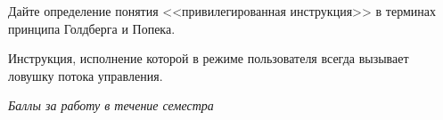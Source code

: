 \documentclass[a4paper, addpoints]{exam}
\begin{document}
\begin{questions}
\question[2] Дайте определение понятия <<привилегированная инструкция>> в терминах принципа Голдберга и Попека.
\begin{solution}[2cm]
Инструкция, исполнение которой в режиме пользователя всегда вызывает ловушку потока управления.
\end{solution}

\bonusquestion \textit{Баллы за работу в течение семестра}

\newpage
\phantom{Blank page}

\end{questions}
\end{document}
